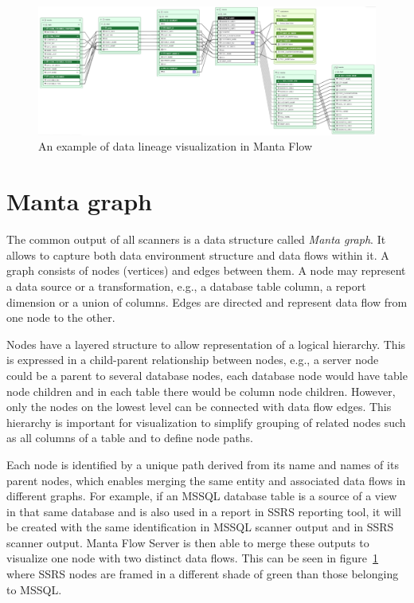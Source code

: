 \begin{figure}[ht]\centering
\includegraphics[width=1.0\textwidth]{img/lineage_example.PNG}
\caption{An example of data lineage visualization in Manta Flow}
\label{fig01:lineage}
\end{figure}  

\section{Manta graph}

The common output of all scanners is a data structure called \textit{Manta graph}. It allows to capture both data environment structure and data flows within it. A graph consists of nodes (vertices) and edges between them. A node may represent a data source or a transformation, e.g., a database table column, a report dimension or a union of columns. Edges are directed and represent data flow from one node to the other.
\par
Nodes have a layered structure to allow representation of a logical hierarchy. This is expressed in a child-parent relationship between nodes, e.g., a server node could be a parent to several database nodes, each database node would have table node children and in each table there would be column node children. However, only the nodes on the lowest level can be connected with data flow edges. This hierarchy is important for visualization to simplify grouping of related nodes such as all columns of a table and to define node paths.
\par
Each node is identified by a unique path derived from its name and names of its parent nodes, which enables merging the same entity and associated data flows in different graphs. For example, if an MSSQL database table is a source of a view in that same database and is also used in a report in SSRS reporting tool, it will be created with the same identification in MSSQL scanner output and in SSRS scanner output. Manta Flow Server is then able to merge these outputs to visualize one node with two distinct data flows. This can be seen in figure~\ref{fig01:lineage} where SSRS nodes are framed in a different shade of green than those belonging to MSSQL.


